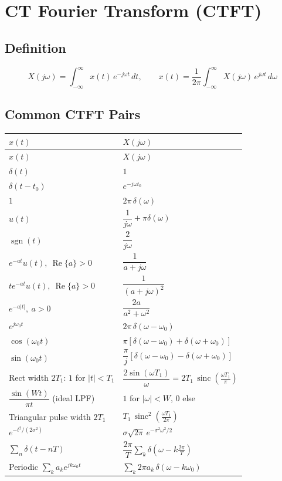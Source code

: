 \documentclass[10pt]{article}
\newcommand{\Real}{\operatorname{Re}}
\newcommand{\sinc}{\operatorname{sinc}}
\newcommand{\sgn}{\operatorname{sgn}}
\begin{document}
\section{CT Fourier Transform (CTFT)}

\subsection{Definition}
\[
X(j\omega) = \int_{-\infty}^{\infty} x(t)\,e^{-j\omega t}\,dt,\qquad
x(t) = \frac{1}{2\pi}\int_{-\infty}^{\infty} X(j\omega)\,e^{j\omega t}\,d\omega
\]

\subsection{Common CTFT Pairs}
\begin{longtable}{@{}ll@{}}
\toprule $x(t)$ & $X(j\omega)$ \\ \midrule \endfirsthead
\toprule $x(t)$ & $X(j\omega)$ \\ \midrule \endhead
\bottomrule \endfoot
$\delta(t)$ & $1$ \\
$\delta(t - t_0)$ & $e^{-j\omega t_0}$ \\
$1$ & $2\pi\,\delta(\omega)$ \\
$u(t)$ & $\dfrac{1}{j\omega} + \pi\delta(\omega)$ \\
$\sgn(t)$ & $\dfrac{2}{j\omega}$ \\
$e^{-at}u(t),\ \Real\{a\} > 0$ & $\dfrac{1}{a + j\omega}$ \\
$t e^{-at}u(t),\ \Real\{a\} > 0$ & $\dfrac{1}{(a + j\omega)^2}$ \\
$e^{-a|t|},\ a>0$ & $\dfrac{2a}{a^2 + \omega^2}$ \\
$e^{j\omega_0 t}$ & $2\pi\,\delta(\omega - \omega_0)$ \\
$\cos(\omega_0 t)$ & $\pi[\delta(\omega - \omega_0) + \delta(\omega + \omega_0)]$ \\
$\sin(\omega_0 t)$ & $\dfrac{\pi}{j}[\delta(\omega - \omega_0) - \delta(\omega + \omega_0)]$ \\
Rect width $2T_1$: $1$ for $|t|<T_1$ & $\dfrac{2\sin(\omega T_1)}{\omega} = 2T_1\,\sinc\!\left(\tfrac{\omega T_1}{\pi}\right)$ \\
$\dfrac{\sin(Wt)}{\pi t}$ (ideal LPF) & $1$ for $|\omega|<W$, $0$ else \\
Triangular pulse width $2T_1$ & $T_1\,\sinc^2\!\left(\tfrac{\omega T_1}{2\pi}\right)$ \\
$e^{-t^2/(2\sigma^2)}$ & $\sigma\sqrt{2\pi}\,e^{-\sigma^2\omega^2/2}$ \\
$\sum_n \delta(t - nT)$ & $\dfrac{2\pi}{T}\sum_k \delta(\omega - k\tfrac{2\pi}{T})$ \\
Periodic $\sum_k a_k e^{jk\omega_0 t}$ & $\sum_k 2\pi a_k\,\delta(\omega - k\omega_0)$ \\
\end{longtable}
\end{document}
